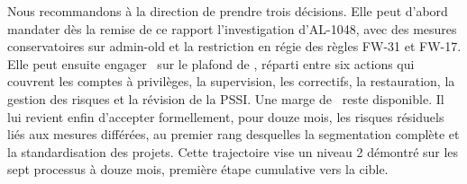Nous recommandons à la direction de prendre trois décisions. Elle peut d'abord mandater dès la remise de ce rapport l'investigation d'AL-1048, avec des mesures conservatoires sur admin-old et la restriction en régie des règles FW-31 et FW-17. Elle peut ensuite engager \TotalRetenu\ sur le plafond de \Plafond, réparti entre six actions qui couvrent les comptes à privilèges, la supervision, les correctifs, la restauration, la gestion des risques et la révision de la PSSI. Une marge de \Marge\ reste disponible. Il lui revient enfin d'accepter formellement, pour douze mois, les risques résiduels liés aux mesures différées, au premier rang desquelles la segmentation complète et la standardisation des projets. Cette trajectoire vise un niveau 2 démontré sur les sept processus à douze mois, première étape cumulative vers la cible.
